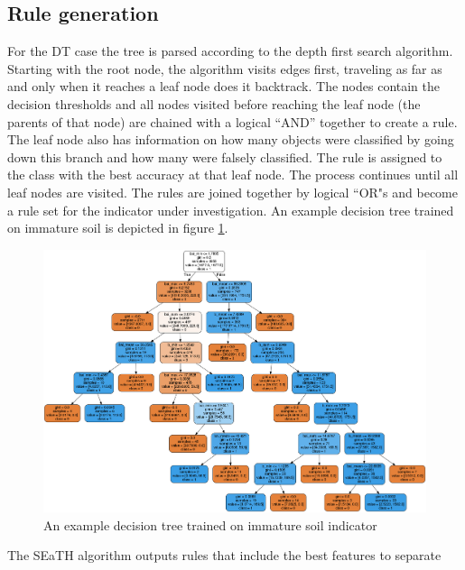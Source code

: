 \documentclass[authoryear,preprint,12pt,number]{elsarticle}
\begin{document}
\subsection{Rule generation}
For the DT case the tree is parsed according to the depth first search
algorithm. Starting with the root node, the algorithm visits edges first, 
traveling as far as and only when it reaches a leaf node does it backtrack. The 
nodes contain the decision thresholds and all nodes visited before reaching the 
leaf node (the parents of that node) are chained with a logical ``AND'' together 
to
create a rule. The leaf node also has information on how many objects were 
classified by 
going down this branch and how many were falsely classified. The rule is 
assigned to the class with the best accuracy at that leaf node. The process 
continues until all leaf nodes are visited. The rules are joined 
together by logical ``OR"s and become a rule set for the indicator under 
investigation. An example decision tree trained on immature soil is depicted in
figure \ref{fig:decisiontree}.
\begin{figure}
    \label{fig:decisiontree}
\includegraphics[width=\textwidth]{diagrams/natfo_immature_soil_dt.png}
    \caption{An example decision tree trained on immature soil indicator}
\end{figure}
The SEaTH algorithm outputs rules that include the best features to separate 
\end{document}
